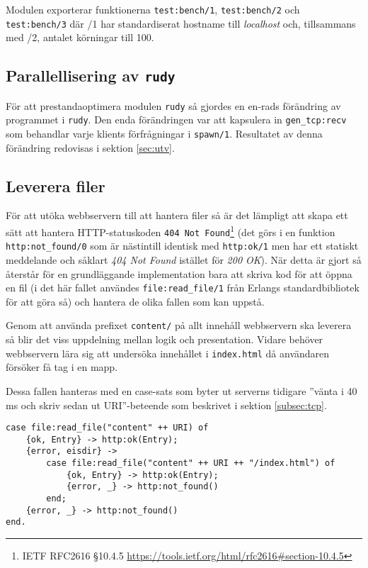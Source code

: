 \documentclass[a4paper, 11pt]{article}
\begin{document}
Modulen exporterar funktionerna \texttt{test:bench/1}, \texttt{test:bench/2} och \texttt{test:bench/3} där /1 har standardiserat hostname till \textit{localhost} och, tillsammans med /2, antalet körningar till 100.

\subsection{Parallellisering av \texttt{rudy}}
För att prestandaoptimera modulen \texttt{rudy} så gjordes en en-rads förändring av programmet i \texttt{rudy}. Den enda förändringen var att kapsulera in \texttt{gen_tcp:recv} som behandlar varje klients förfrågningar i \texttt{spawn/1}. Resultatet av denna förändring redovisas i sektion \ref{sec:utv}.

\subsection{Leverera filer}
\label{subsec:files}

För att utöka webbservern till att hantera filer så är det lämpligt att skapa ett sätt att hantera HTTP-statuskoden \texttt{404 Not Found}\footnote{IETF RFC2616 §10.4.5 \url{https://tools.ietf.org/html/rfc2616\#section-10.4.5}} (det görs i en funktion \texttt{http:not_found/0} som är nästintill identisk med \texttt{http:ok/1} men har ett statiskt meddelande och såklart \textit{404 Not Found} istället för \textit{200 OK}). När detta är gjort så återstår för en grundläggande implementation bara att skriva kod för att öppna en fil (i det här fallet användes \texttt{file:read_file/1} från Erlangs standardbibliotek för att göra så) och hantera de olika fallen som kan uppstå.

Genom att använda prefixet \texttt{content/} på allt innehåll webbservern ska leverera så blir det viss uppdelning mellan logik och presentation. Vidare behöver webbservern lära sig att undersöka innehållet i \texttt{index.html} då användaren försöker få tag i en mapp.

Dessa fallen hanteras med en case-sats som byter ut serverns tidigare ''vänta i 40 ms och skriv sedan ut URI''-beteende som beskrivet i sektion \ref{subsec:tcp}.

\begin{lstlisting}
case file:read_file("content" ++ URI) of
	{ok, Entry} -> http:ok(Entry);
	{error, eisdir} ->
		case file:read_file("content" ++ URI ++ "/index.html") of
			{ok, Entry} -> http:ok(Entry);
			{error, _} -> http:not_found()
		end;
	{error, _} -> http:not_found()
end.
\end{lstlisting}
\end{document}
